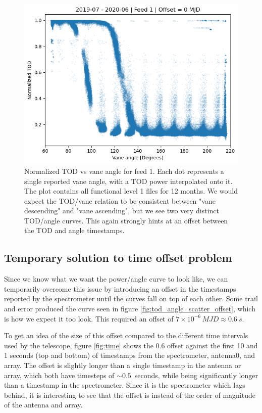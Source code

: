 \documentclass[10pt, a4paper]{article}
\begin{document}
\begin{figure}[H]
    \centering
    \includegraphics[scale=0.6]{../plots/power_angle_all_0.png}
    \caption{Normalized TOD vs vane angle for feed 1. Each dot represents a single reported vane angle, with a TOD power interpolated onto it. The plot contains all functional level 1 files for 12 months. We would expect the TOD/vane relation to be consistent between "vane descending" and "vane ascending", but we see two very distinct TOD/angle curves. This again strongly hints at an offset between the TOD and angle timestamps.}
    \label{fig:tod_angle_scatter}
\end{figure}



\subsection{Temporary solution to time offset problem}
Since we know what we want the power/angle curve to look like, we can temporarily overcome this issue by introducing an offset in the timestamps reported by the spectrometer until the curves fall on top of each other. Some trail and error produced the curve seen in figure \ref{fig:tod_angle_scatter_offset}, which is how we expect it too look. This required an offset of $7\times 10^{-6}\,\si{MJD} \approx \SI{0.6}{s}$.

To get an idea of the size of this offset compared to the different time intervals used by the telescope, figure \ref{fig:time} shows the 0.6 offset against the first 10 and 1 seconds (top and bottom) of timestamps from the spectrometer, antenna0, and array. The offset is slightly longer than a single timestamp in the antenna or array, which both have timesteps of $\sim 0.5$ seconds, while being significantly longer than a timestamp in the spectrometer. Since it is the spectrometer which lags behind, it is interesting to see that the offset is instead of the order of magnitude of the antenna and array.
\end{document}
